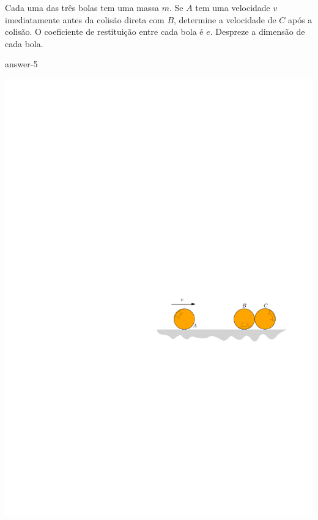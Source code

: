 \item Cada uma das três bolas tem uma massa $m$. Se $A$ tem uma velocidade $v$ imediatamente antes da colisão direta com $B$, determine a velocidade de $C$ após a colisão. O coeficiente de restituição entre cada bola é $e$. Despreze
a dimensão de cada bola.

{answer-5}

\vspace{-1.4cm}
\begin{flushright}
	\includegraphics[scale=1.2]{images/draw_5}
\end{flushright}
